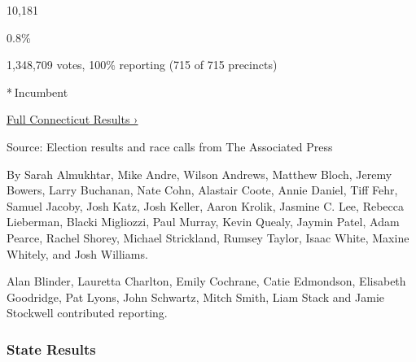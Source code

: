 10,181

0.8\%

1,348,709 votes, 100\% reporting (715 of 715 precincts)

* Incumbent

\href{https://www.nytimes3xbfgragh.onion/interactive/2018/11/06/us/elections/results-connecticut-elections.html}{Full
Connecticut Results ›}

Source: Election results and race calls from The Associated Press

By Sarah Almukhtar, Mike Andre, Wilson Andrews, Matthew Bloch, Jeremy
Bowers, Larry Buchanan, Nate Cohn, Alastair Coote, Annie Daniel, Tiff
Fehr, Samuel Jacoby, Josh Katz, Josh Keller, Aaron Krolik, Jasmine C.
Lee, Rebecca Lieberman, Blacki Migliozzi, Paul Murray, Kevin Quealy,
Jaymin Patel, Adam Pearce, Rachel Shorey, Michael Strickland, Rumsey
Taylor, Isaac White, Maxine Whitely, and Josh Williams.

Alan Blinder, Lauretta Charlton, Emily Cochrane, Catie Edmondson,
Elisabeth Goodridge, Pat Lyons, John Schwartz, Mitch Smith, Liam Stack
and Jamie Stockwell contributed reporting.

\hypertarget{state-results}{%
\subsubsection{State Results}\label{state-results}}

